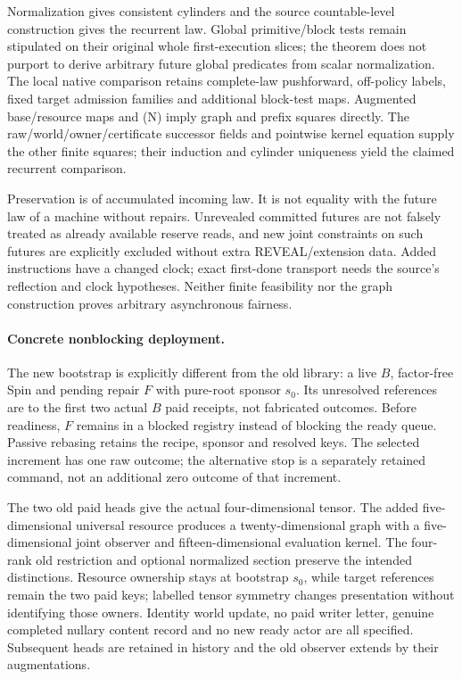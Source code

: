 \documentclass{article}
\begin{document}
Normalization gives consistent cylinders and the source countable-level construction gives the recurrent law. Global primitive/block tests remain stipulated on their original whole first-execution slices; the theorem does not purport to derive arbitrary future global predicates from scalar normalization. The local native comparison retains complete-law pushforward, off-policy labels, fixed target admission families and additional block-test maps. Augmented base/resource maps and (N) imply graph and prefix squares directly. The raw/world/owner/certificate successor fields and pointwise kernel equation supply the other finite squares; their induction and cylinder uniqueness yield the claimed recurrent comparison.

Preservation is of accumulated incoming law. It is not equality with the future law of a machine without repairs. Unrevealed committed futures are not falsely treated as already available reserve reads, and new joint constraints on such futures are explicitly excluded without extra REVEAL/extension data. Added instructions have a changed clock; exact first-done transport needs the source's reflection and clock hypotheses. Neither finite feasibility nor the graph construction proves arbitrary asynchronous fairness.

\paragraph{Concrete nonblocking deployment.}
The new bootstrap is explicitly different from the old library: a live $B$, factor-free Spin and pending repair $F$ with pure-root sponsor $s_0$. Its unresolved references are to the first two actual $B$ paid receipts, not fabricated outcomes. Before readiness, $F$ remains in a blocked registry instead of blocking the ready queue. Passive rebasing retains the recipe, sponsor and resolved keys. The selected increment has one raw outcome; the alternative stop is a separately retained command, not an additional zero outcome of that increment.

The two old paid heads give the actual four-dimensional tensor. The added five-dimensional universal resource produces a twenty-dimensional graph with a five-dimensional joint observer and fifteen-dimensional evaluation kernel. The four-rank old restriction and optional normalized section preserve the intended distinctions. Resource ownership stays at bootstrap $s_0$, while target references remain the two paid keys; labelled tensor symmetry changes presentation without identifying those owners. Identity world update, no paid writer letter, genuine completed nullary content record and no new ready actor are all specified. Subsequent heads are retained in history and the old observer extends by their augmentations.
\end{document}
